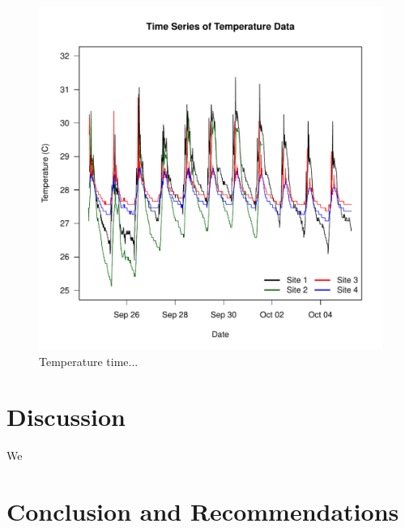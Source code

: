 \documentclass{article}
\begin{document}
\begin{figure}
\includegraphics{Figures/Temp}
\caption{Temperature time...}
\label{Temp}
\end{figure}

\section{Discussion}
We

\section{Conclusion and Recommendations}
\end{document}
